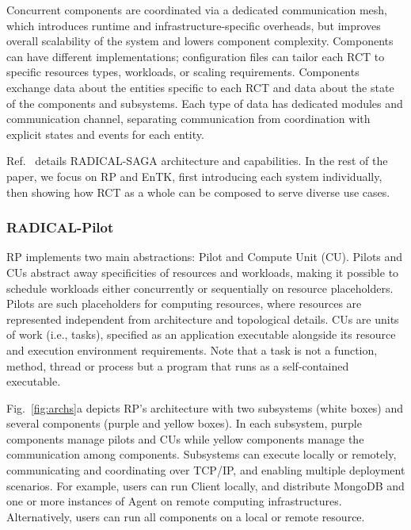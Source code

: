 \documentclass[preprint,12pt, a4paper]{elsarticle}
\begin{document}
Concurrent components are coordinated via a dedicated communication mesh,
which introduces runtime and infrastructure-specific overheads, but improves
overall scalability of the system and lowers component complexity. Components
can have different implementations; configuration files can tailor each RCT
to specific resources types, workloads, or scaling requirements. Components
exchange data about the entities specific to each RCT and data about the
state of the components and subsystems. Each type of data has dedicated
modules and communication channel, separating communication from coordination
with explicit states and events for each entity.

Ref.~\cite{merzky2015saga} details RADICAL-SAGA architecture and
capabilities. In the rest of the paper, we focus on RP and EnTK, first
introducing each system individually, then showing how RCT as a whole can be
composed to serve diverse use cases.

\subsubsection{RADICAL-Pilot}\label{sssec:arch_rp}

RP implements two main abstractions: Pilot and Compute Unit (CU). Pilots and
CUs abstract away specificities of resources and workloads, making it
possible to schedule workloads either concurrently or sequentially on
resource placeholders. Pilots are such placeholders for computing resources,
where resources are represented independent from architecture and topological
details. CUs are units of work (i.e., tasks), specified as an application
executable alongside its resource and execution environment requirements.
Note that a task is not a function, method, thread or process but a program
that runs as a self-contained executable.

Fig.~\ref{fig:archs}a depicts RP's architecture with two subsystems (white
boxes) and several components (purple and yellow boxes). In each subsystem,
purple components manage pilots and CUs while yellow components manage the
communication among components. Subsystems can execute locally or remotely,
communicating and coordinating over TCP/IP, and enabling multiple deployment
scenarios. For example, users can run Client locally, and distribute MongoDB
and one or more instances of Agent on remote computing infrastructures.
Alternatively, users can run all components on a local or remote resource.
\end{document}
